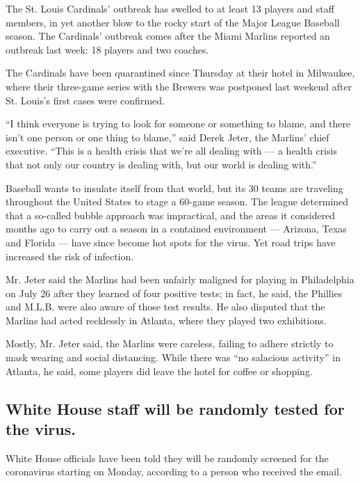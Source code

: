 The St. Louis Cardinals' outbreak has swelled to at least 13 players and
staff members, in yet another blow to the rocky start of the Major
League Baseball season. The Cardinals' outbreak comes after the Miami
Marlins reported an outbreak last week: 18 players and two coaches.

The Cardinals have been quarantined since Thursday at their hotel in
Milwaukee, where their three-game series with the Brewers was postponed
last weekend after St. Louis's first cases were confirmed.

``I think everyone is trying to look for someone or something to blame,
and there isn't one person or one thing to blame,'' said Derek Jeter,
the Marlins' chief executive. ``This is a health crisis that we're all
dealing with --- a health crisis that not only our country is dealing
with, but our world is dealing with.''

Baseball wants to insulate itself from that world, but its 30 teams are
traveling throughout the United States to stage a 60-game season. The
league determined that a so-called bubble approach was impractical, and
the areas it considered months ago to carry out a season in a contained
environment --- Arizona, Texas and Florida --- have since become hot
spots for the virus. Yet road trips have increased the risk of
infection.

Mr. Jeter said the Marlins had been unfairly maligned for playing in
Philadelphia on July 26 after they learned of four positive tests; in
fact, he said, the Phillies and M.L.B. were also aware of those test
results. He also disputed that the Marlins had acted recklessly in
Atlanta, where they played two exhibitions.

Mostly, Mr. Jeter said, the Marlins were careless, failing to adhere
strictly to mask wearing and social distancing. While there was ``no
salacious activity'' in Atlanta, he said, some players did leave the
hotel for coffee or shopping.

\hypertarget{white-house-staff-will-be-randomly-tested-for-the-virus}{%
\subsection{White House staff will be randomly tested for the
virus.}\label{white-house-staff-will-be-randomly-tested-for-the-virus}}

White House officials have been told they will be randomly screened for
the coronavirus starting on Monday, according to a person who received
the email.

